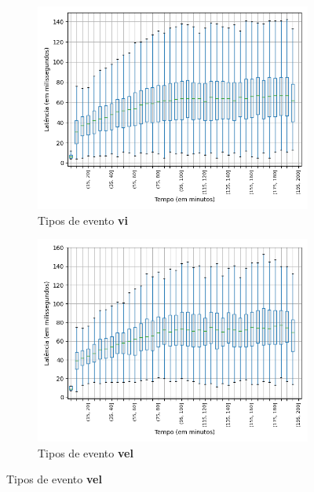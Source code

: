 \begin{figure}
\begin{subfigure}{.5\textwidth}
\centering
\includegraphics[width=\textwidth]{figuras/graphics/boxplot_9-dez-is_vi.png}
\caption{Tipos de evento \textbf{vi}}
\label{fig:BoxPlot_vi_IS_9-dez-is}
\end{subfigure}%
\centering
\begin{subfigure}{.5\textwidth}
\centering
\includegraphics[width=\textwidth]{figuras/graphics/boxplot_9-dez-is_vel.png}
\caption{Tipos de evento \textbf{vel}}
\label{fig:BoxPlot_vel_IS_9-dez-is}
\end{subfigure}%


\end{figure}
